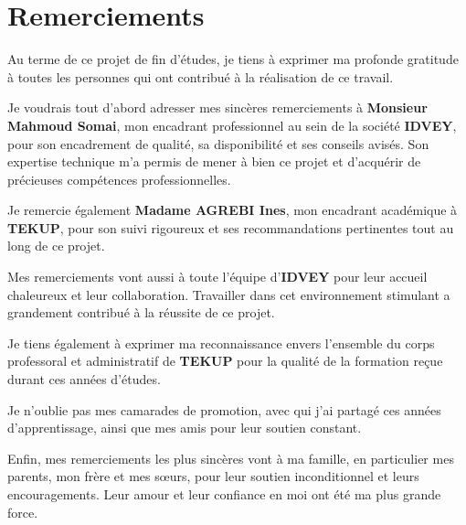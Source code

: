 \chapter*{Remerciements}

\vspace{1cm}

Au terme de ce projet de fin d'études, je tiens à exprimer ma profonde gratitude à toutes les personnes qui ont contribué à la réalisation de ce travail.

\vspace{0.8cm}

Je voudrais tout d'abord adresser mes sincères remerciements à \textbf{Monsieur Mahmoud Somai}, mon encadrant professionnel au sein de la société \textbf{IDVEY}, pour son encadrement de qualité, sa disponibilité et ses conseils avisés. Son expertise technique m'a permis de mener à bien ce projet et d'acquérir de précieuses compétences professionnelles.

\vspace{0.6cm}

Je remercie également \textbf{Madame AGREBI Ines}, mon encadrant académique à \textbf{TEKUP}, pour son suivi rigoureux et ses recommandations pertinentes tout au long de ce projet.

\vspace{0.6cm}

Mes remerciements vont aussi à toute l'équipe d'\textbf{IDVEY} pour leur accueil chaleureux et leur collaboration. Travailler dans cet environnement stimulant a grandement contribué à la réussite de ce projet.

\vspace{0.6cm}

Je tiens également à exprimer ma reconnaissance envers l'ensemble du corps professoral et administratif de \textbf{TEKUP} pour la qualité de la formation reçue durant ces années d'études.

\vspace{0.6cm}

Je n'oublie pas mes camarades de promotion, avec qui j'ai partagé ces années d'apprentissage, ainsi que mes amis pour leur soutien constant.

\vspace{0.6cm}

Enfin, mes remerciements les plus sincères vont à ma famille, en particulier mes parents, mon frère et mes sœurs, pour leur soutien inconditionnel et leurs encouragements. Leur amour et leur confiance en moi ont été ma plus grande force.

\vspace{0.8cm}
